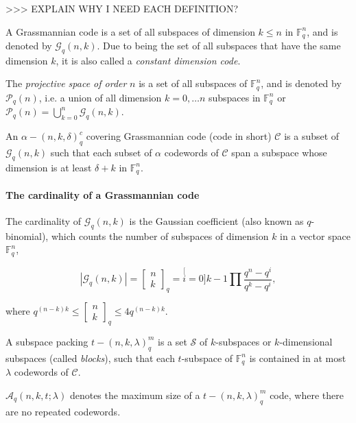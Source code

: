 >\textcompwordmark >\textcompwordmark > EXPLAIN WHY I NEED EACH
DEFINITION?
\begin{defn}
 A Grassmannian code is a set of all subspaces of dimension $k\leq n$
in $\ensuremath{\mathbb{F}}_{q}^{n}$, and is denoted by $\mathcal{G}_{q}\left(n,k\right)$.
Due to being the set of all subspaces that have the same dimension
$k$, it is also called a \textit{constant dimension code}. \cite{Zhang:2019}
\end{defn}
%
\begin{defn}
 The \textit{projective space of order} $n$ is a set of all subspaces
of $\ensuremath{\mathbb{F}}_{q}^{n}$, and is denoted by $\mathcal{P}_{q}\left(n\right)$,
i.e. a union of all dimension $k=0,\ldots n$ subspaces in $\ensuremath{\mathbb{F}}_{q}^{n}$
or $\mathcal{P}_{q}\left(n\right)=\bigcup_{k=0}^{n}\mathcal{G}_{q}\left(n,k\right)$.
\cite{Wachter-Zeh:2018}
\end{defn}
%
\begin{defn}
 An $\alpha-\left(n,k,\delta\right)_{q}^{c}$ covering Grassmannian
code (code in short) $\mathcal{C}$ is a subset of $\mathcal{G}_{q}\left(n,k\right)$
such that each subset of $\alpha$ codewords of $\mathcal{C}$ span
a subspace whose dimension is at least $\delta+k$ in $\ensuremath{\mathbb{F}}_{q}^{n}$.
\cite{Zhang:2019}
\end{defn}

\paragraph{The cardinality of a Grassmannian code}

The cardinality of $\mathcal{G}_{q}\left(n,k\right)$ is the Gaussian
coefficient (also known as $q$-binomial), which counts the number
of subspaces of dimension $k$ in a vector space $\ensuremath{\mathbb{F}}_{q}^{n}$,

\[
\left|\mathcal{G}_{q}\left(n,k\right)\right|=\left[\begin{array}{c}
n\\
k
\end{array}\right]_{q}=\stackrel[i=0]{k-1}{\prod}\frac{q^{n}-q^{i}}{q^{k}-q^{i}},
\]

where $q^{\left(n-k\right)k}\leq\left[\begin{array}{c}
n\\
k
\end{array}\right]_{q}\leq4q^{\left(n-k\right)k}$.

\begin{defn}
 A subspace packing $t-\left(n,k,\lambda\right)_{q}^{m}$ is a set
$\mathcal{S}$ of $k$-subspaces or $k$-dimensional subspaces (called
\textit{blocks}), such that each $t$-subspace of $\ensuremath{\mathbb{F}}_{q}^{n}$
is contained in at most $\lambda$ codewords of $\mathcal{C}$. 
\end{defn}
%
\begin{defn}
$\mathcal{A}_{q}\left(n,k,t;\lambda\right)$ denotes the maximum
size of a $t-\left(n,k,\lambda\right)_{q}^{m}$ code, where there
are no repeated codewords. 
\end{defn}


